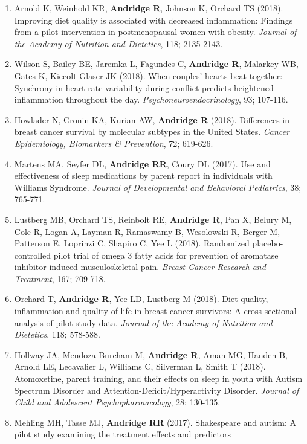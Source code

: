 \documentclass[
  english,
  letterpaper,
  DIV=11,
  numbers=noendperiod]{scrartcl}
\begin{document}
\begin{enumerate}
  701-708.
\item
  Arnold K, Weinhold KR, \textbf{Andridge R}, Johnson K, Orchard TS
  (2018). Improving diet quality is associated with decreased
  inflammation: Findings from a pilot intervention in postmenopausal
  women with obesity. \emph{Journal of the Academy of Nutrition and
  Dietetics}, 118; 2135-2143.
\item
  Wilson S, Bailey BE, Jaremka L, Fagundes C, \textbf{Andridge R},
  Malarkey WB, Gates K, Kiecolt-Glaser JK (2018). When couples' hearts
  beat together: Synchrony in heart rate variability during conflict
  predicts heightened inflammation throughout the day.
  \emph{Psychoneuroendocrinology}, 93; 107-116.
\item
  Howlader N, Cronin KA, Kurian AW, \textbf{Andridge R} (2018).
  Differences in breast cancer survival by molecular subtypes in the
  United States. \emph{Cancer Epidemiology, Biomarkers \& Prevention},
  72; 619-626.
\item
  Martens MA, Seyfer DL, \textbf{Andridge RR}, Coury DL (2017). Use and
  effectiveness of sleep medications by parent report in individuals
  with Williams Syndrome. \emph{Journal of Developmental and Behavioral
  Pediatrics}, 38; 765-771.
\item
  Lustberg MB, Orchard TS, Reinbolt RE, \textbf{Andridge R}, Pan X,
  Belury M, Cole R, Logan A, Layman R, Ramaswamy B, Wesolowski R, Berger
  M, Patterson E, Loprinzi C, Shapiro C, Yee L (2018). Randomized
  placebo-controlled pilot trial of omega 3 fatty acids for prevention
  of aromatase inhibitor-induced musculoskeletal pain. \emph{Breast
  Cancer Research and Treatment}, 167; 709-718.
\item
  Orchard T, \textbf{Andridge R}, Yee LD, Lustberg M (2018). Diet
  quality, inflammation and quality of life in breast cancer survivors:
  A cross-sectional analysis of pilot study data. \emph{Journal of the
  Academy of Nutrition and Dietetics}, 118; 578-588.
\item
  Hollway JA, Mendoza-Burcham M, \textbf{Andridge R}, Aman MG, Handen B,
  Arnold LE, Lecavalier L, Williams C, Silverman L, Smith T (2018).
  Atomoxetine, parent training, and their effects on sleep in youth with
  Autism Spectrum Disorder and Attention-Deficit/Hyperactivity Disorder.
  \emph{Journal of Child and Adolescent Psychopharmacology}, 28;
  130-135.
\item
  Mehling MH, Tasse MJ, \textbf{Andridge RR} (2017). Shakespeare and
  autism: A pilot study examining the treatment effects and predictors

\end{enumerate}
\end{document}
